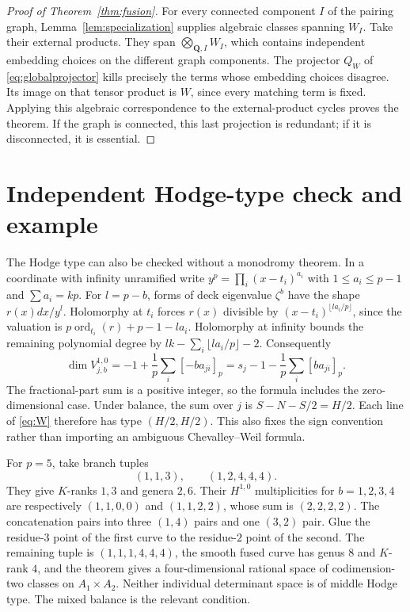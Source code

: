 \documentclass[11pt]{article}
\theoremstyle{definition}
\newcommand{\Q}{\mathbf Q}
\begin{document}
\begin{proof}[Proof of Theorem~\ref{thm:fusion}]
For every connected component $I$ of the pairing graph,
Lemma~\ref{lem:specialization} supplies algebraic classes spanning $W_I$.
Take their external products. They span $\bigotimes_{\Q,I}W_I$, which
contains independent embedding choices on the different graph components.
The projector $Q_W$ of \eqref{eq:globalprojector} kills precisely the terms
whose embedding choices disagree. Its image on that tensor product is $W$,
since every matching term is fixed. Applying this algebraic correspondence
to the external-product cycles proves the theorem. If the graph is connected,
this last projection is redundant; if it is disconnected, it is essential.
\end{proof}

\section{Independent Hodge-type check and example}
The Hodge type can also be checked without a monodromy theorem. In a coordinate
with infinity unramified write $y^p=\prod_i(x-t_i)^{a_i}$ with
$1\leq a_i\leq p-1$ and $\sum a_i=kp$. For $l=p-b$, forms of deck eigenvalue
$\zeta^b$ have the shape $r(x)dx/y^l$. Holomorphy at $t_i$ forces
$r(x)$ divisible by $(x-t_i)^{\lfloor la_i/p\rfloor}$, since the valuation is
$p\operatorname{ord}_{t_i}(r)+p-1-la_i$. Holomorphy at infinity bounds the
remaining polynomial degree by $lk-\sum_i\lfloor la_i/p\rfloor-2$.
Consequently
\[
 \dim V_{j,b}^{1,0}
 =-1+\frac1p\sum_i[-b a_{ji}]_p
 =s_j-1-\frac1p\sum_i[b a_{ji}]_p.
\]
The fractional-part sum is a positive integer, so the formula includes the
zero-dimensional case. Under balance, the sum over $j$ is
$S-N-S/2=H/2$. Each line of \eqref{eq:W} therefore has type $(H/2,H/2)$.
This also fixes the sign convention rather than importing an ambiguous
Chevalley--Weil formula.

For $p=5$, take branch tuples
\[
 (1,1,3),\qquad (1,2,4,4,4).
\]
They give $K$-ranks $1,3$ and genera $2,6$. Their $H^{1,0}$ multiplicities
for $b=1,2,3,4$ are respectively $(1,1,0,0)$ and $(1,1,2,2)$, whose sum is
$(2,2,2,2)$. The concatenation pairs into three $(1,4)$ pairs and one
$(3,2)$ pair. Glue the residue-$3$ point of the first curve to the residue-$2$
point of the second. The remaining tuple is $(1,1,1,4,4,4)$, the smooth
fused curve has genus $8$ and $K$-rank $4$, and the theorem gives a
four-dimensional rational space of codimension-two classes on $A_1\times A_2$.
Neither individual determinant space is of middle Hodge type. The mixed
balance is the relevant condition.
\end{document}
